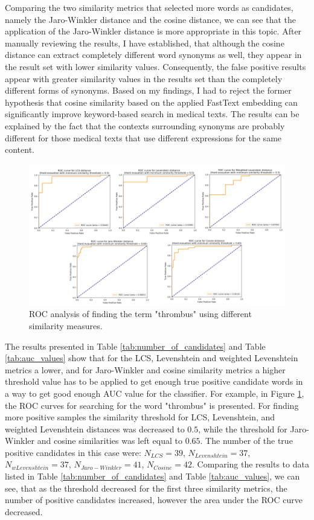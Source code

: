 Comparing the two similarity metrics that selected more words as candidates, namely the Jaro-Winkler distance and the cosine distance, we can see that the application of the Jaro-Winkler distance is more appropriate in this topic. After manually reviewing the results, I have established, that although the cosine distance can extract completely different word synonyms as well, they appear in the result set with lower similarity values. Consequently, the false positive results appear with greater similarity values in the results set than the completely different forms of synonyms. Based on my findings, I had to reject the former hypothesis that cosine similarity based on the applied FastText embedding can significantly improve keyword-based search in medical texts. The results can be explained by the fact that the contexts surrounding synonyms are probably different for those medical texts that use different expressions for the same content.

\begin{figure}[h]
	\centering
        \captionsetup{justification=centering}
	\includegraphics[width=\textwidth]{assets/figures/text_mining/extraction/roc_results.png}
	\caption{ROC analysis of finding the term "thrombus" using different similarity measures.}
	\label{fig:roc_values}
\end{figure}

The results presented in Table \ref{tab:number_of_candidates} and Table \ref{tab:auc_values} show that for the LCS, Levenshtein and weighted Levenshtein metrics a lower, and for Jaro-Winkler and cosine similarity metrics a higher threshold value has to be applied to get enough true positive candidate words in a way to get good enough AUC value for the classifier. For example, in Figure \ref{fig:roc_values}, the ROC curves for searching for the word "thrombus" is presented. For finding more positive samples the similarity threshold for LCS, Levenshtein, and weighted Levenshtein distances was decreased to $0.5$, while the threshold for Jaro-Winkler and cosine similarities was left equal to $0.65$. The number of the true positive candidates in this case were: $N_{LCS}=39$, $N_{Levenshtein}=37$, $N_{wLevenshtein}=37$, $N_{Jaro-Winkler}=41$, $N_{Cosine}=42$. Comparing the results to data listed in Table \ref{tab:number_of_candidates} and Table \ref{tab:auc_values}, we can see, that as the threshold decreased for the first three similarity metrics, the number of positive candidates increased, however the area under the ROC curve decreased.

